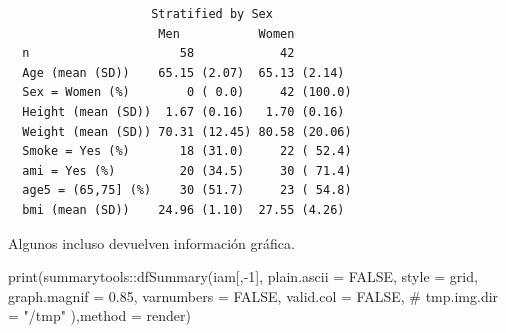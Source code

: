 \documentclass[
  letterpaper,
  DIV=11,
  numbers=noendperiod]{scrreprt}
\newenvironment{Shaded}{\begin{snugshade}}{\end{snugshade}}
\newcommand{\AttributeTok}[1]{\textcolor[rgb]{0.40,0.45,0.13}{#1}}
\newcommand{\CommentTok}[1]{\textcolor[rgb]{0.37,0.37,0.37}{#1}}
\newcommand{\ConstantTok}[1]{\textcolor[rgb]{0.56,0.35,0.01}{#1}}
\newcommand{\DecValTok}[1]{\textcolor[rgb]{0.68,0.00,0.00}{#1}}
\newcommand{\FloatTok}[1]{\textcolor[rgb]{0.68,0.00,0.00}{#1}}
\newcommand{\FunctionTok}[1]{\textcolor[rgb]{0.28,0.35,0.67}{#1}}
\newcommand{\NormalTok}[1]{\textcolor[rgb]{0.00,0.23,0.31}{#1}}
\newcommand{\SpecialCharTok}[1]{\textcolor[rgb]{0.37,0.37,0.37}{#1}}
\newcommand{\StringTok}[1]{\textcolor[rgb]{0.13,0.47,0.30}{#1}}
\begin{document}
\begin{verbatim}
                    Stratified by Sex
                     Men           Women         
  n                     58            42         
  Age (mean (SD))    65.15 (2.07)  65.13 (2.14)  
  Sex = Women (%)        0 ( 0.0)     42 (100.0) 
  Height (mean (SD))  1.67 (0.16)   1.70 (0.16)  
  Weight (mean (SD)) 70.31 (12.45) 80.58 (20.06) 
  Smoke = Yes (%)       18 (31.0)     22 ( 52.4) 
  ami = Yes (%)         20 (34.5)     30 ( 71.4) 
  age5 = (65,75] (%)    30 (51.7)     23 ( 54.8) 
  bmi (mean (SD))    24.96 (1.10)  27.55 (4.26)  
\end{verbatim}

Algunos incluso devuelven información gráfica.

\begin{Shaded}
\begin{Highlighting}[]
\FunctionTok{print}\NormalTok{(summarytools}\SpecialCharTok{::}\FunctionTok{dfSummary}\NormalTok{(iam[,}\SpecialCharTok{{-}}\DecValTok{1}\NormalTok{],}
                        \AttributeTok{plain.ascii  =} \ConstantTok{FALSE}\NormalTok{,}
          \AttributeTok{style        =} \StringTok{\textquotesingle{}grid\textquotesingle{}}\NormalTok{,}
          \AttributeTok{graph.magnif =} \FloatTok{0.85}\NormalTok{,}
          \AttributeTok{varnumbers =} \ConstantTok{FALSE}\NormalTok{,}
          \AttributeTok{valid.col    =} \ConstantTok{FALSE}\NormalTok{,}
          \CommentTok{\# tmp.img.dir  = "/tmp"}
\NormalTok{          ),}\AttributeTok{method =} \StringTok{\textquotesingle{}render\textquotesingle{}}\NormalTok{)}
\end{Highlighting}
\end{Shaded}
\end{document}
